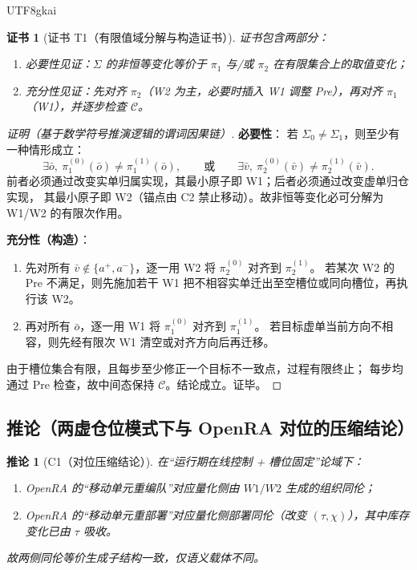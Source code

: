 \documentclass[12pt]{article}
\newtheorem{corollary}{推论}[section]
\newtheorem{Certificate}{证书}[section]
\begin{document}
\begin{CJK*}{UTF8}{gkai}
\begin{Certificate}[证书 T1（有限值域分解与构造证书）]
\label{cert:tex28-ch19-t1}
证书包含两部分：
\begin{enumerate}
  \item 必要性见证：$\Sigma$ 的非恒等变化等价于 $\pi_1$ 与/或 $\pi_2$ 在有限集合上的取值变化；
  \item 充分性见证：先对齐 $\pi_2$（W2 为主，必要时插入 W1 调整 Pre），再对齐 $\pi_1$（W1），并逐步检查 $\mathcal C$。
\end{enumerate}
\end{Certificate}

\begin{proof}[证明（基于数学符号推演逻辑的谓词因果链）]
\textbf{必要性}：
若 $\Sigma_0\neq\Sigma_1$，则至少有一种情形成立：
\[
  \exists \bar o,\ \pi_1^{(0)}(\bar o)\neq\pi_1^{(1)}(\bar o),
  \qquad\text{或}\qquad
  \exists \bar v,\ \pi_2^{(0)}(\bar v)\neq\pi_2^{(1)}(\bar v).
\]
前者必须通过改变实单归属实现，其最小原子即 W1；后者必须通过改变虚单归仓实现，
其最小原子即 W2（锚点由 C2 禁止移动）。故非恒等变化必可分解为 W1/W2 的有限次作用。

\textbf{充分性（构造）}：
\begin{enumerate}
  \item 先对所有 $\bar v\notin\{a^+,a^-\}$，逐一用 W2 将 $\pi_2^{(0)}$ 对齐到 $\pi_2^{(1)}$。
  若某次 W2 的 Pre 不满足，则先施加若干 W1 把不相容实单迁出至空槽位或同向槽位，再执行该 W2。
  \item 再对所有 $\bar o$，逐一用 W1 将 $\pi_1^{(0)}$ 对齐到 $\pi_1^{(1)}$。
  若目标虚单当前方向不相容，则先经有限次 W1 清空或对齐方向后再迁移。
\end{enumerate}
由于槽位集合有限，且每步至少修正一个目标不一致点，过程有限终止；
每步均通过 Pre 检查，故中间态保持 $\mathcal C$。结论成立。证毕。
\end{proof}

\subsection{推论（两虚仓位模式下与 OpenRA 对位的压缩结论）}
\label{subsec:tex28-ch19-cor}

\begin{corollary}[C1（对位压缩结论）]
\label{cor:tex28-ch19-c1}
在“运行期在线控制 + 槽位固定”论域下：
\begin{enumerate}
  \item OpenRA 的“移动单元重编队”对应量化侧由 $W1/W2$ 生成的组织同伦；
  \item OpenRA 的“移动单元重部署”对应量化侧部署同伦（改变 $(\tau,\chi)$），其中库存变化已由 $\tau$ 吸收。
\end{enumerate}
故两侧同伦等价生成子结构一致，仅语义载体不同。
\end{corollary}


\end{CJK*}
\end{document}
